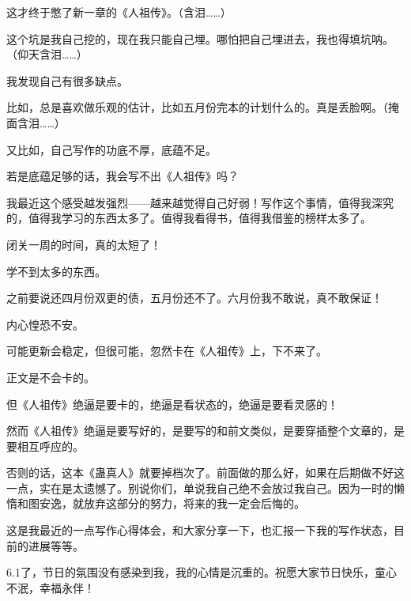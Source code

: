 \begin{this_body}
这才终于憋了新一章的《人祖传》。（含泪……）

这个坑是我自己挖的，现在我只能自己埋。哪怕把自己埋进去，我也得填坑呐。（仰天含泪……）

我发现自己有很多缺点。

比如，总是喜欢做乐观的估计，比如五月份完本的计划什么的。真是丢脸啊。（掩面含泪……）

又比如，自己写作的功底不厚，底蕴不足。

若是底蕴足够的话，我会写不出《人祖传》吗？

我最近这个感受越发强烈——越来越觉得自己好弱！写作这个事情，值得我深究的，值得我学习的东西太多了。值得我看得书，值得我借鉴的榜样太多了。

闭关一周的时间，真的太短了！

学不到太多的东西。

之前要说还四月份双更的债，五月份还不了。六月份我不敢说，真不敢保证！

内心惶恐不安。

可能更新会稳定，但很可能，忽然卡在《人祖传》上，下不来了。

正文是不会卡的。

但《人祖传》绝逼是要卡的，绝逼是看状态的，绝逼是要看灵感的！

然而《人祖传》绝逼是要写好的，是要写的和前文类似，是要穿插整个文章的，是要相互呼应的。

否则的话，这本《蛊真人》就要掉档次了。前面做的那么好，如果在后期做不好这一点，实在是太遗憾了。别说你们，单说我自己绝不会放过我自己。因为一时的懒惰和图安逸，就放弃这部分的努力，将来的我一定会后悔的。

这是我最近的一点写作心得体会，和大家分享一下，也汇报一下我的写作状态，目前的进展等等。

6.1了，节日的氛围没有感染到我，我的心情是沉重的。祝愿大家节日快乐，童心不泯，幸福永伴！

\end{this_body}

